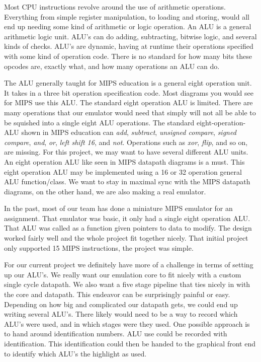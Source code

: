 \documentclass[
    paper=letter,
    parskip=half,
    fontsize=12pt,
    titlepage=firstiscover,
    toc=bibliography,
    numbers=endperiod
]{scrartcl}
\begin{document}
Most CPU instructions revolve around the use of arithmetic operations.
Everything from simple register manipulation, to loading and storing,
would all end up needing some kind of arithmetic or logic operation. An
ALU is a general arithmetic logic unit. ALU's can do adding,
subtracting, bitwise logic, and several kinds of checks. ALU's are
dynamic, having at runtime their operations specified with some kind of
operation code. There is no standard for how many bits these opcodes
are, exactly what, and how many operations an ALU can do.

The ALU generally taught for MIPS education is a general eight operation
unit. It takes in a three bit operation specification code. Most
diagrams you would see for MIPS use this ALU. The standard eight
operation ALU is limited. There are many operations that our emulator
would need that simply will not all be able to be squished into a single
eight ALU operations. The standard eight-operation-ALU shown in MIPS
education can \emph{add}, \emph{subtract}, \emph{unsigned compare},
\emph{signed compare}, \emph{and}, \emph{or}, \emph{left shift 16}, and
\emph{not}. Operations such as \emph{xor}, \emph{flip}, and so on, are
missing. For this project, we may want to have several different ALU
units. An eight operation ALU like seen in MIPS datapath diagrams is a
must. This eight operation ALU may be implemented using a 16 or 32
operation general ALU function/class. We want to stay in maximal sync
with the MIPS datapath diagrams, on the other hand, we are also making a
real emulator.

In the past, most of our team has done a miniature MIPS emulator for an
assignment. That emulator was basic, it only had a single eight
operation ALU. That ALU was called as a function given pointers to data
to modify. The design worked fairly well and the whole project fit
together nicely. That initial project only supported 15 MIPS
instructions, the project was simple.

For our current project we definitely have more of a challenge in terms
of setting up our ALU's. We really want our emulation core to fit nicely
with a custom single cycle datapath. We also want a five stage pipeline
that ties nicely in with the core and datapath. This endeavor can be
surprisingly painful or easy. Depending on how big and complicated our
datapath gets, we could end up writing several ALU's. There likely would
need to be a way to record which ALU's were used, and in which stages
were they used. One possible approach is to hand around identification
numbers. ALU use could be recorded with identification. This
identification could then be handed to the graphical front end to
identify which ALU's the highlight as used.
\end{document}
